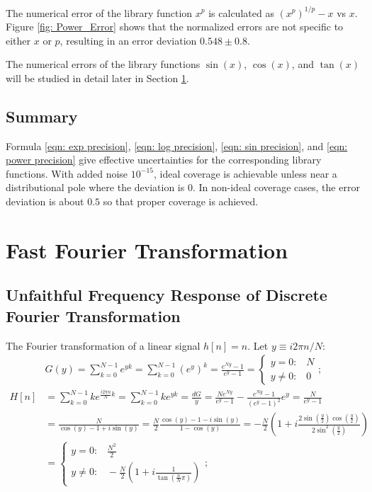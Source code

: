 \documentclass[twoside]{article}
\numberwithin{equation}{section}
\newcommand{\eqspace}{\;\;\;}
\begin{document}
The numerical error of the library function $x^p$ is calculated as $(x^p)^{1/p} - x$ vs $x$.
Figure \ref{fig: Power_Error} shows that the normalized errors are not specific to either $x$ or $p$, resulting in an error deviation $0.548 \pm 0.8$.

The numerical errors of the library functions $\sin(x)$, $\cos(x)$, and $\tan(x)$ will be studied in detail later in Section \ref{sec: FFT}.


\subsection{Summary}

Formula \eqref{eqn: exp precision}, \eqref{eqn: log precision}, \eqref{eqn: sin precision}, and \eqref{eqn: power precision} give effective uncertainties for the corresponding library functions.
With added noise $10^{-15}$, ideal coverage is achievable unless near a distributional pole where the deviation is $0$.
In non-ideal coverage cases, the error deviation is about $0.5$ so that proper coverage is achieved.



\clearpage
\section{Fast Fourier Transformation}
\label{sec: FFT}


\subsection{Unfaithful Frequency Response of Discrete Fourier Transformation \cite{Prev_Precision_Arithmetic}}

\iffalse

The Fourier transformation of a linear signal $h[n] = n$. 
Let $y \equiv i 2\pi n /N$:
\begin{align*}
& G(y) = \sum_{k=0}^{N-1}  e^{y k} = \sum_{k=0}^{N-1}  (e^y)^k = \frac{e^{N y} - 1}{e^y - 1}
 = \begin{cases} y = 0: \eqspace N \\ y \neq 0: \eqspace 0 \end{cases}; \\
H[n] &= \sum_{k=0}^{N-1} k e^{\frac{i 2\pi n}{N} k} = \sum_{k=0}^{N-1} k e^{y k} 
 = \frac{d G}{y} = \frac{N e^{N y}}{e^y - 1} - \frac{e^{N y} - 1}{(e^y - 1)^2} e^y = \frac{N}{e^y - 1} \\
 &= \frac{N}{\cos(y) - 1 + i \sin(y)} = \frac{N}{2} \frac{\cos(y) - 1 -  i \sin(y)}{1 - \cos(y)} 
  = - \frac{N}{2}(1 + i \frac{2 \sin(\frac{y}{2}) \cos(\frac{y}{2})}{2 \sin^2(\frac{y}{2})}) \\
 &= \begin{cases} y = 0: \eqspace \frac{N^2}{2} \\ y \neq 0: \eqspace - \frac{N}{2}(1 + i \frac{1}{\tan(\frac{n}{N} \pi)}) \end{cases};
\end{align*}
\end{document}
